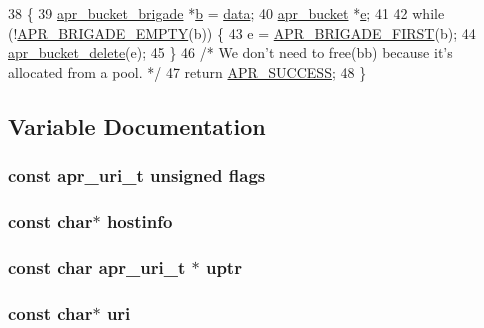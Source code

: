 \begin{DoxyCode}
38 \{
39     \hyperlink{structapr__bucket__brigade}{apr\_bucket\_brigade} *\hyperlink{group__APACHE__CORE__PROTO_ga7fa09c5c80a7d25b74511944f5949e31}{b} = \hyperlink{group__APACHE__CORE__LOG_gae4950db1dbfff8459a712737063b61aa}{data};
40     \hyperlink{structapr__bucket}{apr\_bucket} *\hyperlink{group__APR__Util__Bucket__Brigades_gacd90314acb2c2e5cd19681136c08efac}{e};
41 
42     \textcolor{keywordflow}{while} (!\hyperlink{group__APR__Util__Bucket__Brigades_ga836f61da6cce15074eff257ce4b6fc0f}{APR\_BRIGADE\_EMPTY}(b)) \{
43         e = \hyperlink{group__APR__Util__Bucket__Brigades_gab5826a11eb6ba90786a94282f806c230}{APR\_BRIGADE\_FIRST}(b);
44         \hyperlink{group__APR__Util__Bucket__Brigades_ga8925c02a7f95e8c1c3986294d4678797}{apr\_bucket\_delete}(e);
45     \}
46     \textcolor{comment}{/* We don't need to free(bb) because it's allocated from a pool. */}
47     \textcolor{keywordflow}{return} \hyperlink{group__apr__errno_ga9ee311b7bf1c691dc521d721339ee2a6}{APR\_SUCCESS};
48 \}
\end{DoxyCode}


\subsection{Variable Documentation}
\subsubsection[{\texorpdfstring{flags}{flags}}]{\setlength{\rightskip}{0pt plus 5cm}const {\bf apr\+\_\+uri\+\_\+t} unsigned flags}\hypertarget{group__APR__Util__URI_gad0e5d525fb6ef9a518656fa71faa91eb}{}\label{group__APR__Util__URI_gad0e5d525fb6ef9a518656fa71faa91eb}
\subsubsection[{\texorpdfstring{hostinfo}{hostinfo}}]{\setlength{\rightskip}{0pt plus 5cm}const char$\ast$ hostinfo}\hypertarget{group__APR__Util__URI_ga2b9a5e4287719404cfa1b1a328bd2385}{}\label{group__APR__Util__URI_ga2b9a5e4287719404cfa1b1a328bd2385}
\subsubsection[{\texorpdfstring{uptr}{uptr}}]{\setlength{\rightskip}{0pt plus 5cm}const char {\bf apr\+\_\+uri\+\_\+t} $\ast$ uptr}\hypertarget{group__APR__Util__URI_ga2fb66bf6ec8c67eb2b16f6ffde9952a8}{}\label{group__APR__Util__URI_ga2fb66bf6ec8c67eb2b16f6ffde9952a8}
\subsubsection[{\texorpdfstring{uri}{uri}}]{\setlength{\rightskip}{0pt plus 5cm}const char$\ast$ uri}\hypertarget{group__APR__Util__URI_ga69ec24fb2d0a5f5e532deb9adaab81d6}{}\label{group__APR__Util__URI_ga69ec24fb2d0a5f5e532deb9adaab81d6}
